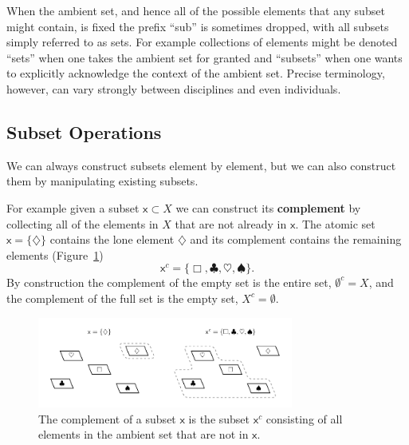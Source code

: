 \documentclass[
  letterpaper,
  DIV=11,
  numbers=noendperiod]{scrartcl}
\begin{document}
When the ambient set, and hence all of the possible elements that any
subset might contain, is fixed the prefix ``sub'' is sometimes dropped,
with all subsets simply referred to as sets. For example collections of
elements might be denoted ``sets'' when one takes the ambient set for
granted and ``subsets'' when one wants to explicitly acknowledge the
context of the ambient set. Precise terminology, however, can vary
strongly between disciplines and even individuals.

\hypertarget{subset-operations}{%
\subsection{Subset Operations}\label{subset-operations}}

We can always construct subsets element by element, but we can also
construct them by manipulating existing subsets.

For example given a subset \(\mathsf{x} \subset X\) we can construct its
\textbf{complement} by collecting all of the elements in \(X\) that are
not already in \(\mathsf{x}\). The atomic set
\(\mathsf{x} = \{ \diamondsuit \}\) contains the lone element
\(\diamondsuit\) and its complement contains the remaining elements
(Figure~\ref{fig-complement}) \[
\mathsf{x}^{c} = \{ \Box, \clubsuit, \heartsuit, \spadesuit \}.
\] By construction the complement of the empty set is the entire set,
\(\emptyset^{c} = X\), and the complement of the full set is the empty
set, \(X^{c} = \emptyset\).

\begin{figure}

{\centering \includegraphics[width=0.75\textwidth,height=\textheight]{figures/complement/complement.pdf}

}

\caption{\label{fig-complement}The complement of a subset \(\mathsf{x}\)
is the subset \(\mathsf{x}^{c}\) consisting of all elements in the
ambient set that are not in \(\mathsf{x}\).}

\end{figure}
\end{document}
